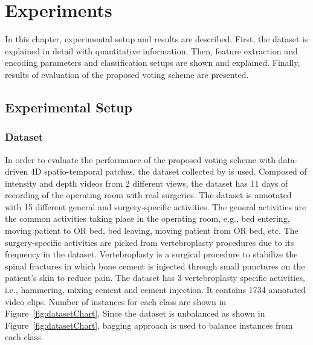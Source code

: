
\chapter{Experiments} %

\label{Chapter4} %


In this chapter, experimental setup and results are described. First, the dataset is explained in detail with quantitative information. Then, feature extraction and encoding parameters and classification setups are shown and explained. Finally, results of evaluation of the proposed voting scheme are presented.
    
    \section{Experimental Setup}
    \label{section:ExperimentalSetup}
    
	    \subsection{Dataset}
        \label{section:Dataset}
        In order to evaluate the performance of the proposed voting scheme with data-driven 4D spatio-temporal patches, the dataset collected by \citet{twinanda2015data} is used. Composed of intensity and depth videos from 2 different views, the dataset has 11 days of recording of the operating room with real surgeries. The dataset is annotated with 15 different general and surgery-specific activities. The general activities are the common activities taking place in the operating room, e.g., bed entering, moving patient to OR bed, bed leaving, moving patient from OR bed, etc. The surgery-specific activities are picked from vertebroplasty procedures due to its frequency in the dataset. Vertebroplasty is a surgical procedure to stabilize the spinal fractures in which bone cement is injected through small punctures on the patient's skin to reduce pain. The dataset has 3 vertebroplasty specific activities, i.e., hammering, mixing cement and cement injection. It contains 1734 annotated video clips. Number of instances for each class are shown in Figure~\ref{fig:datasetChart}. Since the dataset is unbalanced as shown in Figure~\ref{fig:datasetChart}, bagging approach is used to balance instances from each class.


